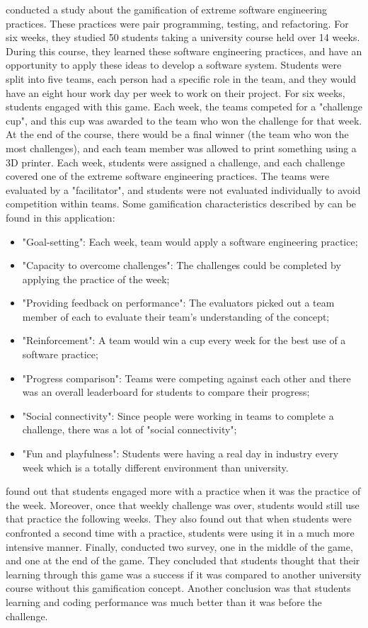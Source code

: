 \documentclass{l4proj}
\begin{document}
\citet{akpolat_enhancing_2014} conducted a study about the gamification of extreme software engineering practices. These practices were pair programming, testing, and refactoring.
For six weeks, they studied 50 students taking a university course held over 14 weeks. During this course, they learned these software engineering practices,
and have an opportunity to apply these ideas to develop a software system. Students were split into five teams, each person had a specific role in the team,
and they would have an eight hour work day per week to work on their project. For six weeks, students engaged with this game. Each week, the teams competed for a "challenge cup", 
and this cup was awarded to the team who won the challenge for that week. At the end of the course, there would be a final winner (the team who won the most challenges),
and each team member was allowed to print something using a 3D printer. Each week, students were assigned a challenge, 
and each challenge covered one of the extreme software engineering practices. The teams were evaluated by a "facilitator", 
and students were not evaluated individually to avoid competition within teams.
Some gamification characteristics described by \citet{cugelman_gamification:_2013} can be found in this application:
\begin{itemize}
    \item "Goal-setting": Each week, team would apply a software engineering practice;
    \item "Capacity to overcome challenges": The challenges could be completed by applying the practice of the week;
    \item "Providing feedback on performance": The evaluators picked out a team member of each to evaluate their team's understanding of the concept;
    \item "Reinforcement": A team would win a cup every week for the best use of a software practice;
    \item "Progress comparison": Teams were competing against each other and there was an overall leaderboard for students to compare their progress;
    \item "Social connectivity": Since people were working in teams to complete a challenge, there was a lot of "social connectivity";
    \item "Fun and playfulness": Students were having a real day in industry every week which is a totally different environment than university.
\end{itemize}
\citet{akpolat_enhancing_2014} found out that students engaged more with a practice when it was the practice of the week. Moreover, once that weekly challenge was over, 
students would still use that practice the following weeks. They also found out that when students were confronted a second time with a practice, 
students were using it in a much more intensive manner. Finally, \citet{akpolat_enhancing_2014} conducted two survey, one in the middle of the game, and one at the end of the game.
They concluded that students thought that their learning through this game was a success if it was compared to another university course without this gamification concept.
Another conclusion was that students learning and coding performance was much better than it was before the challenge.
\end{document}
